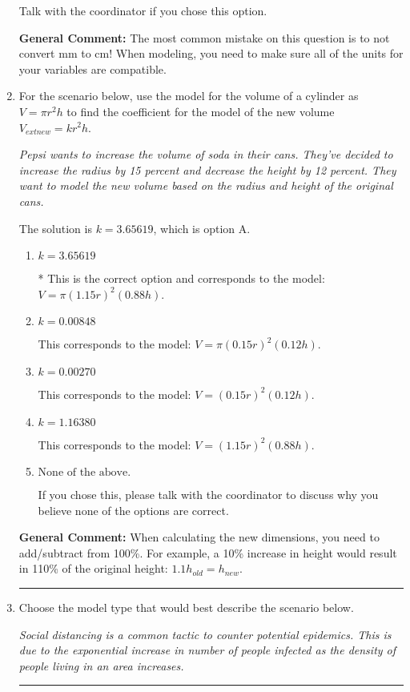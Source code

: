 \documentclass{extbook}[14pt]
\newcommand{\litem}[1]{\item #1

\rule{\textwidth}{0.4pt}}
\begin{document}
\begin{enumerate}
{\begin{enumerate}[label=\Alph*.]
Talk with the coordinator if you chose this option.
\end{enumerate}

\textbf{General Comment:} The most common mistake on this question is to not convert mm to cm! When modeling, you need to make sure all of the units for your variables are compatible.
}
\litem{
For the scenario below, use the model for the volume of a cylinder as $V = \pi r^2 h$ to find the coefficient for the model of the new volume $V_{	ext{new}} = k r^2 h$.

\begin{center}
    \textit{ Pepsi wants to increase the volume of soda in their cans. They've decided to increase the radius by 15 percent and decrease the height by 12 percent. They want to model the new volume based on the radius and height of the original cans. }
\end{center}


The solution is \( k = 3.65619 \), which is option A.\begin{enumerate}[label=\Alph*.]
\item \( k = 3.65619 \)

* This is the correct option and corresponds to the model: $V = \pi (1.15 r)^2 (0.88 h)$.
\item \( k = 0.00848 \)

This corresponds to the model: $V = \pi (0.15 r)^2 (0.12 h)$.
\item \( k = 0.00270 \)

This corresponds to the model: $V = (0.15 r)^2 (0.12 h)$.
\item \( k = 1.16380 \)

This corresponds to the model: $V = (1.15 r)^2 (0.88 h)$.
\item \( \text{None of the above.} \)

If you chose this, please talk with the coordinator to discuss why you believe none of the options are correct.
\end{enumerate}

\textbf{General Comment:} When calculating the new dimensions, you need to add/subtract from 100\%. For example, a 10\% increase in height would result in 110\% of the original height: $1.1h_{old} = h_{new}$.
}
\litem{
Choose the model type that would best describe the scenario below.

\begin{center}
    \textit{ Social distancing is a common tactic to counter potential epidemics. This is due to the exponential increase in number of people infected as the density of people living in an area increases. }
\end{center}


}
\end{enumerate}
\end{document}

